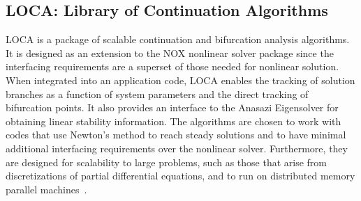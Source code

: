 \documentclass[acmtoms,acmnow]{acmtrans2m}
\begin{document}
%
%
% 
%

\subsection{LOCA: Library of Continuation Algorithms}

LOCA is a package of scalable continuation and bifurcation analysis algorithms.
It is designed as an extension to the NOX nonlinear solver package since
the interfacing requirements are a superset of those needed for nonlinear solution.
When integrated into an application code, 
LOCA enables the tracking of solution branches as a function of system 
parameters and the direct tracking of bifurcation points. It also provides
an interface to the Anasazi Eigensolver for obtaining linear stability 
information.  The algorithms are chosen to work with codes that use
Newton's method to reach steady solutions and to have minimal 
additional interfacing requirements over the nonlinear solver.
Furthermore, they are designed for scalability to
large problems, such as those that arise from 
discretizations of partial differential equations, and to run on distributed
memory parallel machines~\cite{LOCA-MPSalsa-paper}.  
\end{document}

